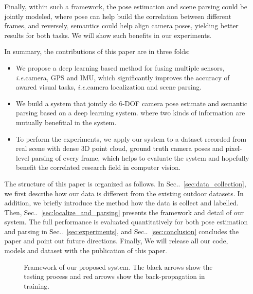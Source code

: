 \documentclass[10pt,twocolumn,letterpaper]{article}
\makeatletter
\newcommand{\secref}[1]{Sec\onedot~\ref{#1}}
\DeclareRobustCommand\onedot{\futurelet\@let@token\@onedot}
\def\onedot{\ifx\@let@token.\else.\null\fi\xspace}
\def\ie{\emph{i.e.}}
\makeatother
\begin{document}
Finally, within such a framework, the pose estimation and scene parsing could be jointly modeled, where pose can help build the correlation between different frames, and reversely, semantics could help align camera poses, yielding better results for both tasks. We will show such benefits in our experiments.

In summary, the contributions of this paper are in three folds:
\begin{itemize}
    \item We propose a deep learning based method for fusing multiple sensors, \ie camera, GPS and IMU, which significantly improves the accuracy of awared visual tasks, \ie camera localization and scene parsing.
    \item We build a system that jointly do 6-DOF camera pose estimate and semantic parsing based on a deep learning system. where two kinds of information are mutually benefitial in the system.
    \item To perform the experiments, we apply our system to a dataset recorded from real scene with dense 3D point cloud, ground truth camera poses and pixel-level parsing of every frame, which helps to evaluate the system and hopefully benefit the correlated research field in computer vision.
\end{itemize}

The structure of this paper is organized as follows. In \secref{sec:data_collection}, we first describe how our data is different from the existing outdoor datasets. In addition, we briefly introduce the method how the data is collect and labelled. Then, \secref{sec:localize_and_parsing} presents the framework and detail of our system. The full performance is evaluated quantitatively for both pose estimation and parsing in \secref{sec:experiments}, and \secref{sec:conclusion} concludes the paper and point out future directions. Finally, We will release all our code, models and dataset with the publication of this paper.

\begin{figure*}
\fbox{\rule{0pt}{2in} \rule{.9\linewidth}{0pt}}
   \caption{Framework of our proposed system. The black arrows show the testing process and red arrows show the back-propagation in training.}
\label{fig:framework}
\end{figure*}
\end{document}
